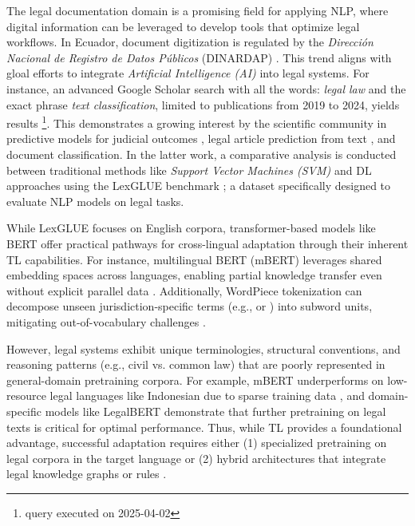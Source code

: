\documentclass[onecolumn, journal, english, 12pt, a4paper]{IEEEtran} %
\theoremstyle{definition}
\begin{document}
The legal documentation domain is a promising field for applying NLP,
where digital information can be leveraged to develop tools that
optimize legal workflows. In Ecuador, document digitization is
regulated by the \emph{Dirección Nacional de Registro de Datos
  Públicos} (DINARDAP) \cite{dinardap2020}. This trend aligns with
gloal efforts to integrate \textit{Artificial Intelligence (AI)} into legal
systems. For instance, an advanced Google Scholar search with all the
words: \emph{ 
   legal law} and the exact phrase
\emph{text classification}, limited to publications from 2019 to 2024,
yields  results \footnote{query executed on
  2025-04-02}. This demonstrates a growing interest by the scientific
community in predictive models for judicial outcomes
\cite{mumcuouglu2021natural, kalia2022classifying, wang2020deep},
legal article prediction from text \cite{yan2019law}, and document
classification\cite{clavie2021}. In the latter work, a comparative
analysis is conducted between traditional methods like \emph{Support
  Vector Machines (SVM)} and DL approaches using the
LexGLUE benchmark \cite{lexglue2021}; a dataset specifically designed
to evaluate NLP models on legal tasks.

While LexGLUE focuses on English corpora, transformer-based models
like BERT \cite{devlin2018bert} offer practical pathways for
cross-lingual adaptation through their inherent TL
capabilities. For instance, multilingual BERT (mBERT) leverages shared
embedding spaces across languages, enabling partial knowledge transfer
even without explicit parallel data
\cite{pires2019multilingual}. Additionally, WordPiece tokenization can
decompose unseen jurisdiction-specific terms (e.g.,  or
) into subword units, mitigating
out-of-vocabulary challenges \cite{wu2016google}.

However, legal systems exhibit unique terminologies, structural
conventions, and reasoning patterns (e.g., civil vs. common law) that
are poorly represented in general-domain pretraining corpora. For
example, mBERT underperforms on low-resource legal languages like
Indonesian due to sparse training data \cite{savelka2021cross}, and
domain-specific models like LegalBERT \cite{chalkidis2020legal}
demonstrate that further pretraining on legal texts is critical for
optimal performance. Thus, while TL provides a
foundational advantage, successful adaptation requires either (1)
specialized pretraining on legal corpora in the target language or (2)
hybrid architectures that integrate legal knowledge graphs or rules
\cite{liu2022legal}.
\end{document}
